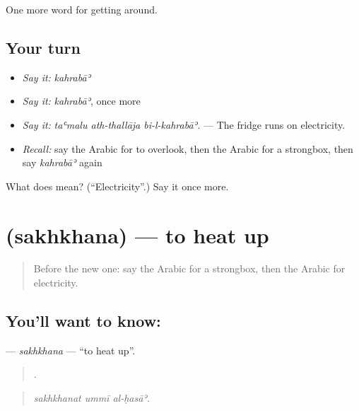 \begin{grammarlens}[title={What you've built}]
One more word for getting around.
\end{grammarlens}

\subsection*{Your turn}
\begin{itemize}
\raggedright
  \item \emph{Say it:} \emph{kahrabāʾ}
  \item \emph{Say it:} \emph{kahrabāʾ}, once more
  \item \emph{Say it:} \emph{taʿmalu ath-thallāja bi-l-kahrabāʾ.} — The fridge runs on electricity.
  \item \emph{Recall:} say the Arabic for to overlook, then the Arabic for a strongbox, then say \emph{kahrabāʾ} again
\end{itemize}

\begin{tcolorbox}[breakable,colback=teal!4,colframe=teal!35!black,title={Before you move on}]
What does  mean? (\textquotedblleft{}Electricity\textquotedblright{}.) Say it once more.
\end{tcolorbox}
\section[\texorpdfstring{\ar{سخن} (sakhkhana)}{سخن (sakhkhana)}]{ (sakhkhana) — to heat up}

\label{lesson:AR-C444-sakhkhana}



\begin{quote}
Before the new one: say the Arabic for a strongbox, then the Arabic for electricity.
\end{quote}

\subsection*{You'll want to know: }
\textbf{} — \emph{sakhkhana} — \textquotedblleft{}to heat up\textquotedblright{}.

\begin{quote}
  .
\end{quote}

\begin{quote}
\emph{sakhkhanat ummī al-ḥasāʾ.}
\end{quote}

